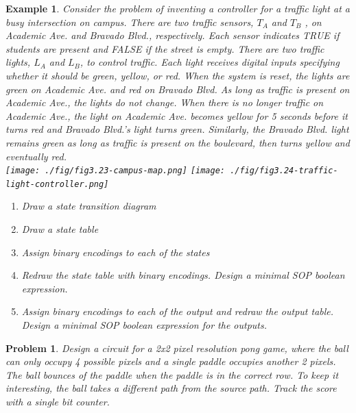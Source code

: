\documentclass{article}
\newtheorem{example}{Example}
\newtheorem{prob}{Problem}
\begin{document}
\begin{example}
  Consider the problem of inventing a controller for a traffic light at a busy
  intersection on campus. There are two traffic
  sensors, $T_A$ and $T_B$ , on Academic Ave. and Bravado Blvd., respectively.
  Each sensor indicates TRUE if students are present and FALSE if the
  street is empty. There are two traffic lights, $L_A$ and $L_B$, to control
  traffic. Each light receives digital inputs specifying whether it should be
  green, yellow, or red.
  When the system is reset, the lights are green on Academic Ave. and red on Bravado Blvd.
  As long as traffic is present on Academic Ave., the lights do not change. When there
  is no longer traffic on Academic Ave., the light on Academic Ave.
  becomes yellow for 5 seconds before it turns red and Bravado Blvd.’s light
  turns green. Similarly, the Bravado Blvd. light remains green as long as
  traffic is present on the boulevard, then turns yellow and eventually red.
  \\
  \texttt{[image: ./fig/fig3.23-campus-map.png]}
  \texttt{[image: ./fig/fig3.24-traffic-light-controller.png]}
  \begin{enumerate}
  \item Draw a state transition diagram
  \item Draw a state table 
  \item Assign binary encodings to each of the states
  \item Redraw the state table with binary encodings. Design a minimal SOP
    boolean expression.
  \item Assign binary encodings to each of the output and redraw the output
    table. Design a minimal SOP boolean expression for the outputs.
  \end{enumerate}
\end{example}


\begin{prob}
  Design a circuit for a 2x2 pixel resolution pong game, where the ball can only
  occupy 4 possible pixels and a single paddle occupies another 2 pixels. The
  ball bounces of the paddle when the paddle is in the correct row. To keep it
  interesting, the ball takes a different path from the source path. Track the
  score with a single bit counter.
\end{prob}



\end{document}
